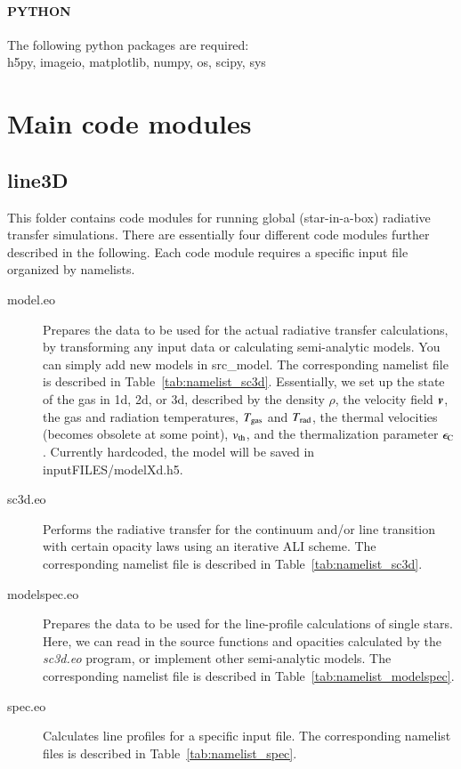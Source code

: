 \documentclass[10pt,a4paper]{article}
\begin{document}
\paragraph{PYTHON}
The following python packages are required: \\
h5py, imageio, matplotlib, numpy, os, scipy, sys
%
%
%
\section{Main code modules}
\subsection{line3D}
\label{subsec:line3d}
This folder contains code modules for running global (star-in-a-box)
radiative transfer simulations. There are essentially four different
code modules further described in the following. Each code module
requires a specific input file organized by namelists.

\begin{description}
\item[model.eo] Prepares the data to be used for the actual radiative
  transfer calculations, by transforming any input data or calculating
  semi-analytic models. You can simply add new models in
  src\_model. The corresponding namelist file is described in
  Table~\ref{tab:namelist_sc3d}. Essentially, we set up the state of
  the gas in 1d, 2d, or 3d, described by the density $\rho$, the
  velocity field $\boldsymbol{v}$, the gas and radiation temperatures,
  $T_{\rm gas}$ and $T_{\rm rad}$, the thermal velocities (becomes obsolete at some
  point), $v_{\rm th}$, and the thermalization parameter $\epsilon_{\rm C}$. Currently hardcoded, the model will be saved in
  inputFILES/modelXd.h5.
\item[sc3d.eo] Performs the radiative transfer for the continuum
  and/or line transition with certain opacity laws using an iterative
  ALI scheme. The corresponding namelist file is described in
  Table~\ref{tab:namelist_sc3d}.
\item[modelspec.eo] Prepares the data to be
  used for the line-profile calculations of single stars. Here, we can
  read in the source functions and opacities calculated by the
  \textit{sc3d.eo} program, or implement other semi-analytic
  models. The corresponding namelist file is described in
  Table~\ref{tab:namelist_modelspec}.
\item[spec.eo] Calculates line profiles for a specific input file. The
  corresponding namelist files is described in
  Table~\ref{tab:namelist_spec}.
\end{description}
\end{document}
